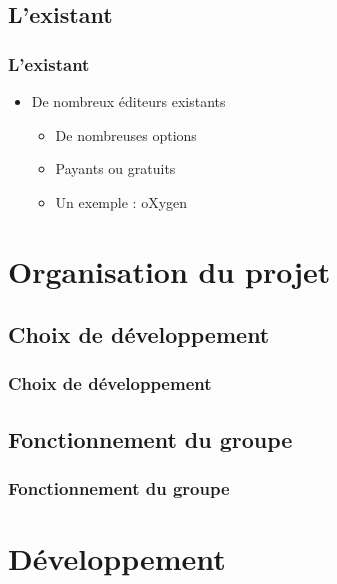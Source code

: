 \documentclass{beamer}
\begin{document}
	\subsection{L'existant}

	\begin{frame}
		\frametitle{L'existant}


    \begin{itemize}
    \item De nombreux éditeurs existants
    \pause
       \begin{itemize}
        \item De nombreuses options
        \pause
        \item Payants ou gratuits
        \pause
        \item Un exemple : oXygen
        \end{itemize}
    \end{itemize}


	\end{frame}




	\section{Organisation du projet}

	\subsection{Choix de développement}

	\begin{frame}
		\frametitle{Choix de développement}
	\end{frame}

	\subsection{Fonctionnement du groupe}

	\begin{frame}
		\frametitle{Fonctionnement du groupe}
	\end{frame}




	\section{Développement}
\end{document}
